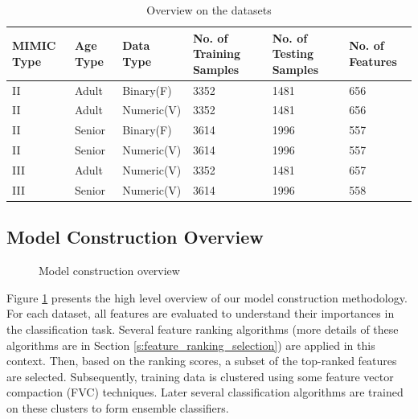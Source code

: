 \begin{table}[h] 
	\centering \caption{Overview on the datasets} 
	\begin{tabular}{|l||l||l||l||l||l|}\hline
			\textbf{MIMIC Type} & 	\textbf{Age Type} & \textbf{Data Type}  & \textbf{No. of Training Samples} & \textbf{No. of Testing Samples} & \textbf{No. of Features} \\\hline
			II & Adult & Binary(F) & 3352 & 1481 & 656 \\\hline
			II & Adult & Numeric(V) & 3352 & 1481 & 656 \\\hline
			II & Senior & Binary(F) & 3614 & 1996 & 557 \\\hline
			II & Senior & Numeric(V) & 3614 & 1996 & 557 \\\hline
			III & Adult & Numeric(V) & 3352 & 1481 & 657 \\\hline
			III & Senior & Numeric(V) & 3614 & 1996 & 558 \\\hline
	\end{tabular}
	\label{t:datasetoverview}
\end{table} 
  
 
\subsection{Model Construction Overview}

\begin{figure}[h]
\centering
{}
\caption{Model construction overview} \label{fig:ClassificationModelGenerationPhase}
\end{figure}

Figure \ref{fig:ClassificationModelGenerationPhase} presents the high level overview of our model construction methodology. For each dataset, all features are evaluated to understand their importances in the classification task. Several feature ranking algorithms (more details of  these algorithms are in Section \ref{s:feature_ranking_selection}) are applied in this context. Then, based on the ranking scores, a subset of the top-ranked features are selected. Subsequently, training data is clustered using some feature vector compaction (FVC) techniques. Later several classification algorithms are trained on these clusters to form ensemble classifiers.  

